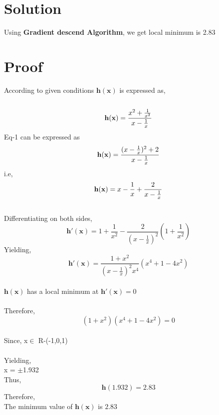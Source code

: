 \documentclass[journal,12pt,twocolumn]{IEEEtran}
\let\vec\mathbf
\begin{document}
\section{Solution}
Using \textbf{Gradient descend Algorithm}, we get local minimum is 2.83

\section{Proof}
According to given conditions $\vec{h(x)}$ is expressed as,\\
\\
\begin{equation}
	\vec{h(x)} = \frac{x^2+\frac{1}{x^2}}{x-\frac{1}{x}} \label{eq-2}\\
\end{equation}
Eq-1 can be expressed as
\begin{equation}
	\vec{h(x)} = \frac{(x-\frac{1}{x})^2 + 2}{x-\frac{1}{x}} \label{eq-2}\\
\end{equation}
i.e,
\begin{equation}
	\vec{h(x)} = x-\frac{1}{x} + \frac{2}{x-\frac{1}{x}} \label{eq-3}\\
\end{equation}
\\
Differentiating on both sides,
\begin{equation}
	\vec{h'(x)} = 1+\frac{1}{x^2} - \frac{2}{(x-\frac{1}{x})^2}(1+\frac{1}{x^2})\label{eq-4}
\end{equation}
 Yielding,   \\
 \begin{equation}
	 \vec{h'(x)} = \frac{1+x^2}{(x-\frac{1}{x})^2x^4}(x^4+1-4x^2)
 \end{equation}
 \\
$\vec{h(x)}$ has a local minimum at $\vec{h'(x)} = 0$\\
\\
Therefore,
\begin{equation}
(1+x^2)(x^4+1-4x^2) = 0
\end{equation}
\\
Since,  x$\in$ R-(-1,0,1)\\
\\
Yielding,
\\
x = $\pm$1.932\\
Thus, $$\vec{h}(1.932) = 2.83$$
Therefore,\\
The minimum value of $\boldsymbol{h(x)}$ is $\boldsymbol{2.83}$
\end{document}
